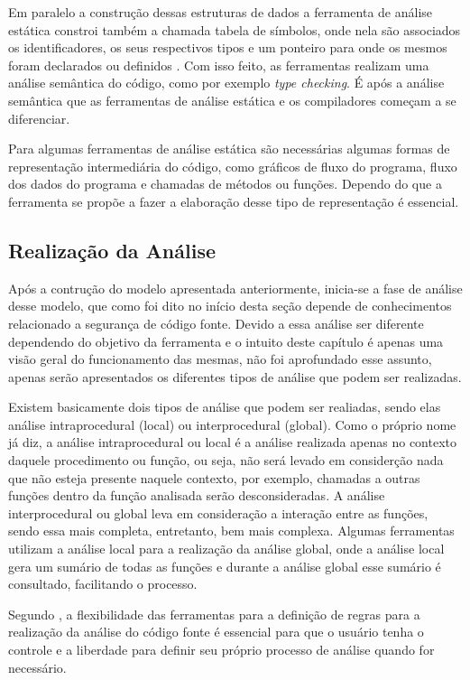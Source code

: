 Em paralelo a construção dessas estruturas de dados a ferramenta de análise
estática constroi também a chamada tabela de símbolos, onde nela são associados
os identificadores, os seus respectivos tipos e um ponteiro para onde os mesmos
foram declarados ou definidos \cite{chess&west2007}. Com isso feito, as
ferramentas realizam uma análise semântica do código, como por exemplo
\textit{type checking}. É após a análise semântica que as ferramentas de análise
estática e os compiladores começam a se diferenciar.

Para algumas ferramentas de análise estática são necessárias algumas formas de
representação intermediária do código, como gráficos de fluxo do programa, fluxo
dos dados do programa e chamadas de métodos ou funções. Dependo do que a
ferramenta se propõe a fazer a elaboração desse tipo de representação é
essencial.

\subsection{Realização da Análise}

Após a contrução do modelo apresentada anteriormente, inicia-se a fase de
análise desse modelo, que como foi dito no início desta seção depende de
conhecimentos relacionado a segurança de código fonte. Devido a essa análise ser
diferente dependendo do objetivo da ferramenta e o intuito deste capítulo é
apenas uma visão geral do funcionamento das mesmas, não foi aprofundado esse
assunto, apenas serão apresentados os diferentes tipos de análise que podem ser
realizadas.

Existem basicamente dois tipos de análise que podem ser realiadas, sendo elas
análise intraprocedural (local) ou interprocedural (global). Como o próprio nome
já diz, a análise intraprocedural ou local é a análise realizada apenas no contexto
daquele procedimento ou função, ou seja, não será levado em considerção nada que
não esteja presente naquele contexto, por exemplo, chamadas a outras funções
dentro da função analisada serão desconsideradas. A análise interprocedural ou
global leva em consideração a interação entre as funções, sendo essa mais
completa, entretanto, bem mais complexa. Algumas ferramentas utilizam a análise
local para a realização da análise global, onde a análise local gera um sumário
de todas as funções e durante a análise global esse sumário é consultado,
facilitando o processo.

Segundo , a flexibilidade das ferramentas para a
definição de regras para a realização da análise do código fonte é essencial
para que o usuário tenha o controle e a liberdade para definir seu próprio
processo de análise quando for necessário.

